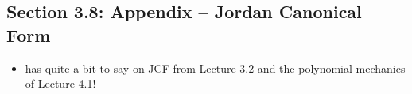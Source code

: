 \documentclass[../notes.tex]{subfiles}
\begin{document}
\subsection*{Section 3.8: Appendix -- Jordan Canonical Form}
\begin{itemize}
    \item \textcite{bib:Teschl} has quite a bit to say on JCF from Lecture 3.2 and the polynomial mechanics of Lecture 4.1!
\end{itemize}
\end{document}
